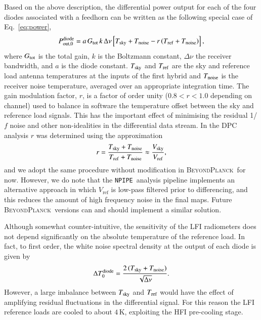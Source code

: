 \documentclass[twocolumn]{aa}
\newcommand{\BP}{\textsc{BeyondPlanck}}
\newcommand{\npipe}[0]{\texttt{NPIPE}}
\begin{document}
Based on the above description, the differential power output for each
of the four diodes associated with a feedhorn can be written as the following
special case of Eq.~\eqref{eq:power},
\begin{equation}
  P_{{\rm out},0}^{\rm diode} = a\, G_{\rm tot}\,k\,\Delta\nu \left[ T_{\rm sky} + T_{\rm noise} - r\left( T_{\rm ref} + T_{\rm noise}\right) \right],
  \label{eq_p0}
\end{equation}
where $G_{\rm tot}$ is the total gain, $k$ is the Boltzmann constant,
$\Delta\nu$ the receiver bandwidth, and $a$ is the diode constant.
$T_{\rm sky}$ and $T_{\rm ref}$ are the sky and reference load antenna
temperatures at the inputs of the first hybrid and $T_{\rm noise}$ is
the receiver noise temperature, averaged over an appropriate
integration time. The gain modulation factor, $r$, is a factor of order
unity ($0.8 < r < 1.0$ depending on channel) used to balance in
software the temperature offset between the sky and reference load
signals. This has the important effect of minimising the residual
1/$f$ noise and other non-idealities in the differential data stream.
In the DPC analysis \citep{planck2016-l02} $r$ was determined using
the approximation
\begin{equation}
  r = \frac{T_{\rm sky} + T_{\rm noise}}{T_{\rm ref} + T_{\rm noise}} \approx \frac{V_{\rm sky}}{V_{\rm ref}},
  \label{eq_r}
\end{equation}
and we adopt the same procedure without modification in \BP\ for
now. However, we do note that the \npipe\ analysis pipeline implements
an alternative approach in which $V_{\mathrm{ref}}$ is low-pass
filtered prior to differencing, and this reduces the amount of high
frequency noise in the final maps. Future \BP\ versions can and should
implement a similar solution.

Although somewhat counter-intuitive, the sensitivity of the LFI
radiometers does not depend significantly on the absolute temperature
of the reference load.  In fact, to first order, the white noise
spectral density at the output of each diode is given by
\begin{equation}
  \Delta T_0^{\rm diode} = \frac{2\,(T_{\rm sky}+T_{\rm noise})}{\sqrt{\Delta\nu}}.
  \label{eq_deltat_diode_ideal}
\end{equation}
However, a large imbalance between $T_{\rm sky}$ and $T_{\rm ref}$
would have the effect of amplifying residual fluctuations in the
differential signal. For this reason the LFI reference loads are
cooled to about $4$\,K, exploiting the HFI pre-cooling stage.
\end{document}
